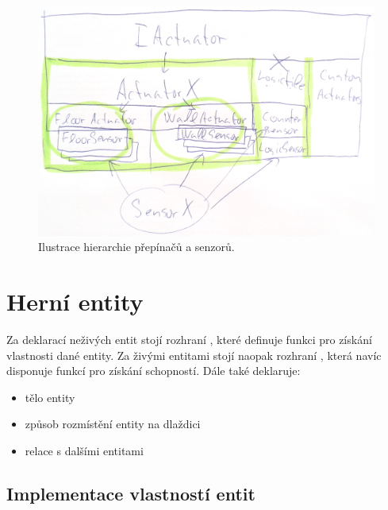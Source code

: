\begin{figure}[H]\centering
\includegraphics[width=\textwidth]{./img/actuator-sensor-hierarchii.png}
\caption{Ilustrace hierarchie přepínačů a senzorů.}
\label{actuator-sensor-hierarchii}
\end{figure}

\section{Herní entity}

Za deklarací neživých entit stojí rozhraní , které definuje funkci  pro získání vlastnosti dané entity.
Za živými entitami stojí naopak rozhraní , která navíc disponuje funkcí  pro získání schopností. Dále
také deklaruje:

\begin{itemize}
\item tělo entity
\item způsob rozmístění entity na dlaždici
\item relace s dalšími entitami
\end{itemize}

\subsection{Implementace vlastností entit}

